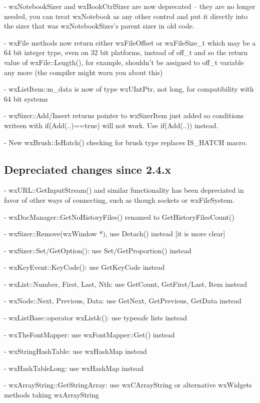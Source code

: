 - wxNotebookSizer and wxBookCtrlSizer are now deprecated -- they are no longer
  needed, you can treat wxNotebook as any other control and put it directly
  into the sizer that was wxNotebookSizer's parent sizer in old code.

- wxFile methods now return either wxFileOffset or wxFileSize\_t which may be a
  64 bit integer type, even on 32 bit platforms, instead of off\_t and so the
  return value of wxFile::Length(), for example, shouldn't be assigned to off\_t
  variable any more (the compiler might warn you about this)

- wxListItem::m\_data is now of type wxUIntPtr, not long, for compatibility
  with 64 bit systems

- wxSizer::Add/Insert returns pointer to wxSizerItem just added so conditions
  writeen with if(Add(..)==true) will not work. Use if(Add(..)) instead.

- New wxBrush::IsHatch() checking for brush type replaces IS_HATCH macro.



\subsection{Depreciated changes since 2.4.x}\label{depreciatedsince24}

- wxURL::GetInputStream() and similar functionality has been depreciated in
  favor of other ways of connecting, such as though sockets or wxFileSystem.

- wxDocManager::GetNoHistoryFiles() renamed to GetHistoryFilesCount()

- wxSizer::Remove(wxWindow *), use Detach() instead [it is more clear]

- wxSizer::Set/GetOption(): use Set/GetProportion() instead

- wxKeyEvent::KeyCode(): use GetKeyCode instead

- wxList::Number, First, Last, Nth: use GetCount, GetFirst/Last, Item instead

- wxNode::Next, Previous, Data: use GetNext, GetPrevious, GetData instead

- wxListBase::operator wxList&(): use typesafe lists instead

- wxTheFontMapper: use wxFontMapper::Get() instead

- wxStringHashTable: use wxHashMap instead

- wxHashTableLong: use wxHashMap instead

- wxArrayString::GetStringArray: use wxCArrayString or alternative wxWidgets
                                 methods taking wxArrayString

